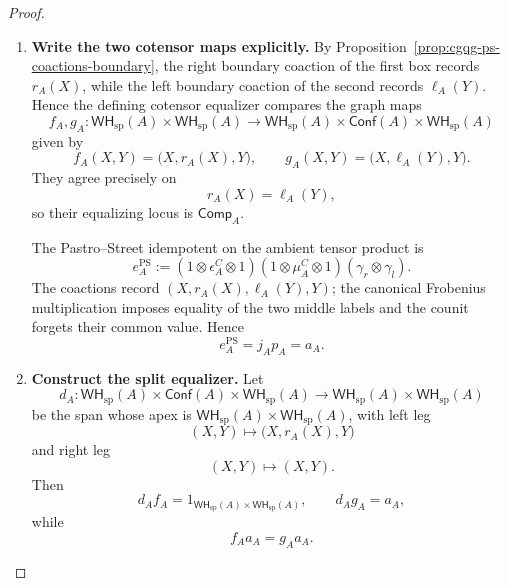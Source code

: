 \documentclass[oneside]{article}
\newcommand{\Conf}{\mathsf{Conf}}
\newcommand{\WH}{\mathsf{WH}}
\theoremstyle{plain}
\theoremstyle{definition}
\theoremstyle{remark}
\begin{document}
\begin{proof}
    \leavevmode
    \begin{enumerate}[beginpenalty=10000]
        \item \textbf{Write the two cotensor maps explicitly.} By Proposition~\ref{prop:cgqg-ps-coactions-boundary}, the right boundary coaction of the first box records \(r_A(X)\), while the left boundary coaction of the second records \(\ell_A(Y)\). Hence the defining cotensor equalizer compares the graph maps
        \[
            f_A,g_A:
            \WH_{\mathrm{sp}}(A)\times\WH_{\mathrm{sp}}(A)
            \longrightarrow
            \WH_{\mathrm{sp}}(A)\times
            \Conf(A)\times
            \WH_{\mathrm{sp}}(A)
        \]
        given by
        \[
            f_A(X,Y)
            =
            \bigl(X,r_A(X),Y\bigr),
            \qquad
            g_A(X,Y)
            =
            \bigl(X,\ell_A(Y),Y\bigr).
        \]
        They agree precisely on
        \[
            r_A(X)=\ell_A(Y),
        \]
        so their equalizing locus is \(\mathsf{Comp}_A\).

        The Pastro--Street idempotent on the ambient tensor product is
        \begin{equation}
            e_A^{\mathrm{PS}}
            :=
            (1\otimes\epsilon_A^C\otimes1)
            (1\otimes\mu_A^C\otimes1)
            (\gamma_r\otimes\gamma_l).
            \label{eq:cgqg-game-ps-relative-tensor-idempotent}
        \end{equation}
        The coactions record \((X,r_A(X),\ell_A(Y),Y)\); the canonical Frobenius multiplication imposes equality of the two middle labels and the counit forgets their common value. Hence
        \begin{equation}
            e_A^{\mathrm{PS}}=j_Ap_A=a_A.
            \label{eq:cgqg-ps-idempotent-equals-boundary-idempotent}
        \end{equation}

        \item \textbf{Construct the split equalizer.} Let
        \[
            d_A:
            \WH_{\mathrm{sp}}(A)\times
            \Conf(A)\times
            \WH_{\mathrm{sp}}(A)
            \longrightarrow
            \WH_{\mathrm{sp}}(A)\times\WH_{\mathrm{sp}}(A)
        \]
        be the span whose apex is \(\WH_{\mathrm{sp}}(A)\times\WH_{\mathrm{sp}}(A)\), with left leg
        \[
            (X,Y)
            \longmapsto
            \bigl(X,r_A(X),Y\bigr)
        \]
        and right leg
        \[
            (X,Y)\longmapsto(X,Y).
        \]
        Then
        \[
            d_Af_A
            =
            1_{\WH_{\mathrm{sp}}(A)\times\WH_{\mathrm{sp}}(A)},
            \qquad
            d_Ag_A
            =
            a_A,
        \]
        while
        \[
            f_Aa_A=g_Aa_A.
        \]


\end{enumerate}
\end{proof}
\end{document}
